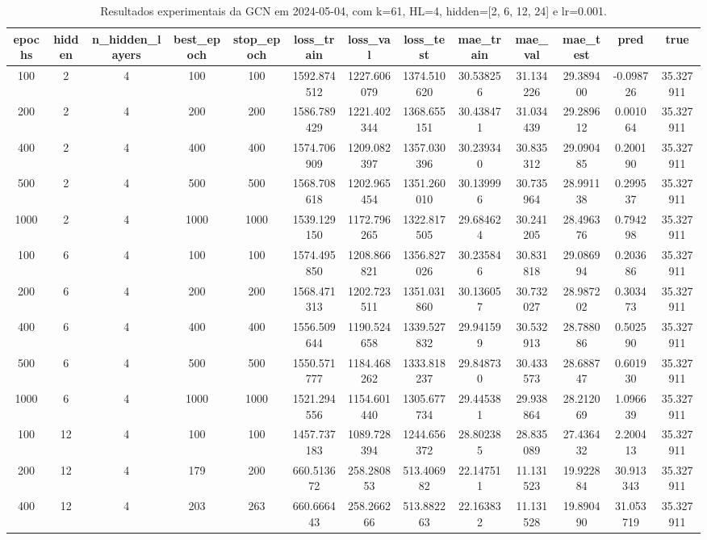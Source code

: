 \begin{table}[h]
\centering
\caption{Resultados experimentais da GCN em 2024-05-04, com k=61, HL=4, hidden=[2, 6, 12, 24] e lr=0.001.}
\label{tab:gcn_results_k61_hl4_d20240504}
\begin{tabular}{ccccccccccccc}
\toprule
epochs & hidden & n\_hidden\_layers & best\_epoch & stop\_epoch & loss\_train & loss\_val & loss\_test & mae\_train & mae\_val & mae\_test & pred & true \\
\midrule
100 & 2 & 4 & 100 & 100 & 1592.874512 & 1227.606079 & 1374.510620 & 30.538256 & 31.134226 & 29.389400 & -0.098726 & 35.327911 \\
200 & 2 & 4 & 200 & 200 & 1586.789429 & 1221.402344 & 1368.655151 & 30.438471 & 31.034439 & 29.289612 & 0.001064 & 35.327911 \\
400 & 2 & 4 & 400 & 400 & 1574.706909 & 1209.082397 & 1357.030396 & 30.239340 & 30.835312 & 29.090485 & 0.200190 & 35.327911 \\
500 & 2 & 4 & 500 & 500 & 1568.708618 & 1202.965454 & 1351.260010 & 30.139996 & 30.735964 & 28.991138 & 0.299537 & 35.327911 \\
1000 & 2 & 4 & 1000 & 1000 & 1539.129150 & 1172.796265 & 1322.817505 & 29.684624 & 30.241205 & 28.496376 & 0.794298 & 35.327911 \\
100 & 6 & 4 & 100 & 100 & 1574.495850 & 1208.866821 & 1356.827026 & 30.235846 & 30.831818 & 29.086994 & 0.203686 & 35.327911 \\
200 & 6 & 4 & 200 & 200 & 1568.471313 & 1202.723511 & 1351.031860 & 30.136057 & 30.732027 & 28.987202 & 0.303473 & 35.327911 \\
400 & 6 & 4 & 400 & 400 & 1556.509644 & 1190.524658 & 1339.527832 & 29.941599 & 30.532913 & 28.788086 & 0.502590 & 35.327911 \\
500 & 6 & 4 & 500 & 500 & 1550.571777 & 1184.468262 & 1333.818237 & 29.848730 & 30.433573 & 28.688747 & 0.601930 & 35.327911 \\
1000 & 6 & 4 & 1000 & 1000 & 1521.294556 & 1154.601440 & 1305.677734 & 29.445381 & 29.938864 & 28.212069 & 1.096639 & 35.327911 \\
100 & 12 & 4 & 100 & 100 & 1457.737183 & 1089.728394 & 1244.656372 & 28.802385 & 28.835089 & 27.436432 & 2.200413 & 35.327911 \\
200 & 12 & 4 & 179 & 200 & 660.513672 & 258.280853 & 513.406982 & 22.147511 & 11.131523 & 19.922884 & 30.913343 & 35.327911 \\
400 & 12 & 4 & 203 & 263 & 660.666443 & 258.266266 & 513.882263 & 22.163832 & 11.131528 & 19.890490 & 31.053719 & 35.327911 \\

\end{tabular}
\end{table}
